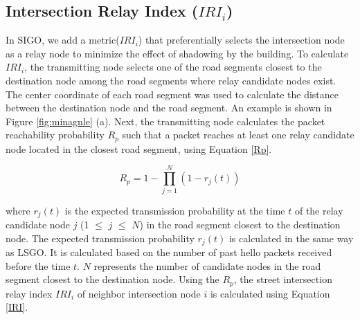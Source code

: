 \documentclass{comex}
\begin{document}


 
\subsection{Intersection Relay Index ($IRI_i$)}

In SIGO,  we add a metric($IRI_i$) that preferentially selects the intersection node as a relay node to minimize the effect of shadowing by the building. To calculate $IRI_i$, the transmitting node selects one of the road segments closest to the destination node among the road segments where relay candidate nodes exist. The center coordinate of each road segment was used to calculate the distance between the destination node and the road segment. 
An example is shown in Figure \ref{fig:minagnle} (a). 
Next, the transmitting node calculates the packet reachability probability $R_p$ such that a packet reaches at least one relay candidate node located in the closest road segment, using Equation \ref{Rp}.

\begin{equation}
\label{Rp}
R_{p} = 1 - \prod_{j=1}^N (1 - r_{j}(t))
\end{equation}

where $r_j(t)$ is the expected transmission probability at the time $t$ of the relay candidate node $j$ (1 $\leq$  $j$ $\leq$ $N$) in the road segment closest to the destination node. 
The expected transmission probability $r_j (t)$ is calculated in the same way as LSGO.
 It is calculated based on the number of past hello packets received before the time $t$.
$N$ represents the number of candidate nodes in the road segment closest to the destination node. 
Using the $R_p$, the street intersection relay  index $IRI_i$ of neighbor intersection node $i$ is calculated using Equation \ref{IRI}.
\end{document}
